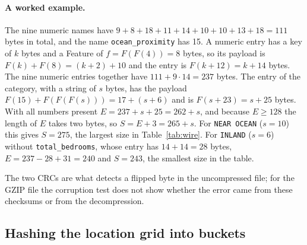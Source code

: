 \paragraph{A worked example.} The nine numeric names have $9 + 8 + 18 + 11 + 14 + 10 + 10 + 13 + 18 = 111$ bytes in total, and the name \texttt{ocean\_proximity} has 15. A numeric entry has a key of $k$ bytes and a Feature of $f = F(F(4)) = 8$ bytes, so its payload is $F(k) + F(8) = (k + 2) + 10$ and the entry is $F(k + 12) = k + 14$ bytes. The nine numeric entries together have $111 + 9 \cdot 14 = 237$ bytes. The entry of the category, with a string of $s$ bytes, has the payload $F(15) + F(F(F(s))) = 17 + (s + 6)$ and is $F(s + 23) = s + 25$ bytes. With all numbers present $E = 237 + s + 25 = 262 + s$, and because $E \ge 128$ the length of $E$ takes two bytes, so $S = E + 3 = 265 + s$. For \texttt{NEAR OCEAN} ($s = 10$) this gives $S = 275$, the largest size in Table~\ref{tab:wire}. For \texttt{INLAND} ($s = 6$) without \texttt{total\_bedrooms}, whose entry has $14 + 14 = 28$ bytes, $E = 237 - 28 + 31 = 240$ and $S = 243$, the smallest size in the table.

The two CRCs are what detects a flipped byte in the uncompressed file; for the GZIP file the corruption test does not show whether the error came from these checksums or from the decompression.

\subsection{Hashing the location grid into buckets}

